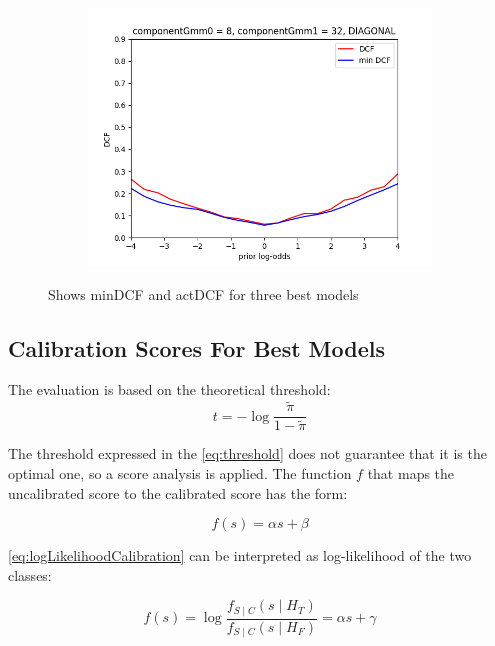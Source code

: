 \begin{figure}[h!]
\begin{subfigure}[b]{0.30\linewidth}
        \includegraphics[width=\linewidth]{Lab/11. Lab 11/Images/BestConfiguration/03. GMM}
        \label{fig:GMM}
    \end{subfigure}
    \caption{Shows minDCF and actDCF for three best models}
    \label{fig:BestConfiguration}
\end{figure}

\subsection{Calibration Scores For Best Models}
\label{subsec:calibrationScores}
The evaluation is based on the theoretical threshold:
\begin{equation}
    t= - \log \frac{\tilde{\pi}}{1 - \tilde{\pi}}
    \label{eq:threshold}
\end{equation}

The threshold expressed in the \autoref{eq:threshold} does not guarantee that it is the optimal one,
so a score analysis is applied.
The function \(f\) that maps the uncalibrated score to the calibrated score has the form:

\begin{equation}
    f(s) = \alpha s + \beta
    \label{eq:eqCalibration}
\end{equation}

\autoref{eq:logLikelihoodCalibration} can be interpreted as log-likelihood of the two classes:

\begin{equation}
    f(s) = \log {\frac{f_{S\mid C}(s\mid H_T)} {f_{S\mid C}(s\mid H_F)}} = \alpha s + \gamma
    \label{eq:logLikelihoodCalibration}
\end{equation}

